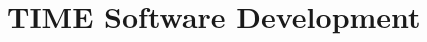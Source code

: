 \documentclass[manuscript]{aastex}
\begin{document}
\begin{figure}[!ht]%
    \centering
    \qquad
    \singlespace
    \caption[]{}%
    \label{fig:time2ab}%
\end{figure}

\begin{figure}[!ht]%
    \centering
    \qquad
    \singlespace
    \caption[]{}%
    \label{fig:time2ab}%
\end{figure}

\section{TIME Software Development}
\end{document}
